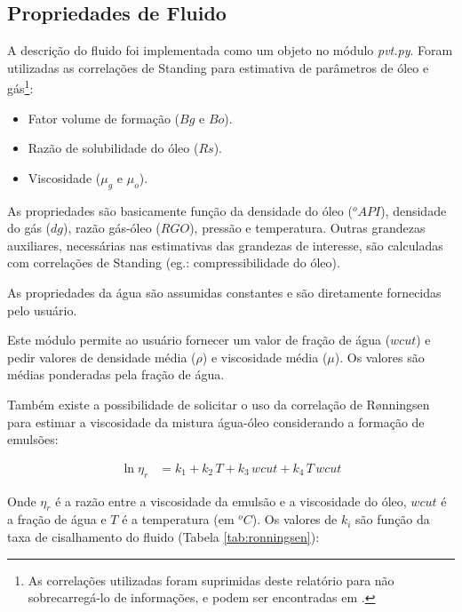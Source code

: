 \documentclass[final,5p]{elsarticle}
\numberwithin{equation}{section}
\begin{document}
    \subsection{Propriedades de Fluido}

        A descrição do fluido foi implementada como um objeto no módulo \emph{pvt.py}. Foram utilizadas as correlações de Standing\cite{standing1952volumetric} para estimativa de parâmetros de óleo e gás\footnote{As correlações utilizadas foram suprimidas deste relatório para não sobrecarregá-lo de informações, e podem ser encontradas em \cite{rosa2006engenharia}.}:

        \begin{itemize}
            \item Fator volume de formação ($Bg$ e $Bo$).
            \item Razão de solubilidade do óleo ($Rs$).
            \item Viscosidade ($\mu_g$ e $\mu_o$).
        \end{itemize}

        As propriedades são basicamente função da densidade do óleo ($^oAPI$), densidade do gás ($dg$), razão gás-óleo ($RGO$), pressão e temperatura. Outras grandezas auxiliares, necessárias nas estimativas das grandezas de interesse, são calculadas com correlações de Standing (eg.: compressibilidade do óleo).

        As propriedades da água são assumidas constantes e são diretamente fornecidas pelo usuário.

        Este módulo permite ao usuário fornecer um valor de fração de água ($wcut$) e pedir valores de densidade média ($\rho$) e viscosidade média ($\mu$). Os valores são médias ponderadas pela fração de água.

        Também existe a possibilidade de solicitar o uso da correlação de Rønningsen para estimar a viscosidade da mistura água-óleo considerando a formação de emulsões\cite{doi:10.1021/ef00041a001}:

        \begin{align}
            \ln \eta_r &= k_1 + k_2 \, T + k_3 \, wcut  + k_4 \, T \, wcut
        \end{align}

        Onde $\eta_r$ é a razão entre a viscosidade da emulsão e a viscosidade do óleo, $wcut$ é a fração de água e $T$ é a temperatura (em $^oC$). Os valores de $k_i$ são função da taxa de cisalhamento do fluido (Tabela \ref{tab:ronningsen}):
\end{document}
